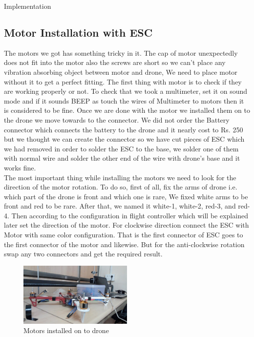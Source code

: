 \documentclass[12pt, oneside]{report}
\numberwithin{equation}{section}
\begin{document}
\begin{chapter}{Implementation}
\subsection{Motor Installation with ESC}
The motors we got has something tricky in it. The cap of motor unexpectedly does not fit into the motor also the screws are short so we can’t place any vibration absorbing object between motor and drone, We need to place motor without it to get a perfect fitting. The first thing with motor is to check if they are working properly or not. To check that we took a multimeter, set it on sound mode and if it sounds BEEP as touch the wires of Multimeter to motors then it is considered to be fine. Once we are done with the motor we installed them on to the drone we move towards to the connector. We did not order the Battery connector which connects the battery to the drone and it nearly cost to Rs. 250 but we thought we can create the connector so we have cut pieces of ESC which we had removed in order to solder the ESC to the base, we solder one of them with normal wire and solder the other end of the wire with drone’s base and it works fine.\\
    The most important thing while installing the motors we need to look for the direction of the motor rotation. To do so, first of all, fix the arms of drone i.e. which part of the drone is front and which one is rare, We fixed white arms to be front and red to be rare. After that, we named it white-1, white-2, red-3, and red-4. Then according to the configuration in flight controller which will be explained later set the direction of the motor. For clockwise direction connect the ESC with Motor with same color configuration. That is the first connector of ESC goes to the first connector of the motor and likewise. But for the anti-clockwise rotation swap any two connectors and get the required result.\\
\begin{figure}
\center
\includegraphics[width=0.5\textwidth]{motor_install}
\caption{Motors installed on to drone}
\end{figure}


\end{chapter}
\end{document}
